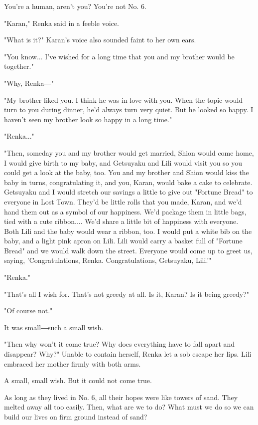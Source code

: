 You're a human, aren't you? You're not No. 6.

"Karan," Renka said in a feeble voice.

"What is it?" Karan's voice also sounded faint to her own ears.

"You know... I've wished for a long time that you and my brother would
be together."

"Why, Renka―"

"My brother liked you. I think he was in love with you. When the topic
would turn to you during dinner, he'd always turn very quiet. But he
looked so happy. I haven't seen my brother look so happy in a long
time."

"Renka..."

"Then, someday you and my brother would get married, Shion would come
home, I would give birth to my baby, and Getsuyaku and Lili would visit
you so you could get a look at the baby, too. You and my brother and
Shion would kiss the baby in turns, congratulating it, and you, Karan,
would bake a cake to celebrate. Getsuyaku and I would stretch our
savings a little to give out "Fortune Bread" to everyone in Lost Town.
They'd be little rolls that you made, Karan, and we'd hand them out as a
symbol of our happiness. We'd package them in little bags, tied with a
cute ribbon.... We'd share a little bit of happiness with everyone. Both
Lili and the baby would wear a ribbon, too. I would put a white bib on
the baby, and a light pink apron on Lili. Lili would carry a basket full
of "Fortune Bread" and we would walk down the street. Everyone would
come up to greet us, saying, 'Congratulations, Renka. Congratulations,
Getsuyaku, Lili.'"

"Renka."

"That's all I wish for. That's not greedy at all. Is it, Karan? Is it
being greedy?"

"Of course not."

It was small―such a small wish.

"Then why won't it come true? Why does everything have to fall apart and
disappear? Why?" Unable to contain herself, Renka let a sob escape her
lips. Lili embraced her mother firmly with both arms.

A small, small wish. But it could not come true.

As long as they lived in No. 6, all their hopes were like towers of
sand. They melted away all too easily. Then, what are we to do? What
must we do so we can build our lives on firm ground instead of sand?

